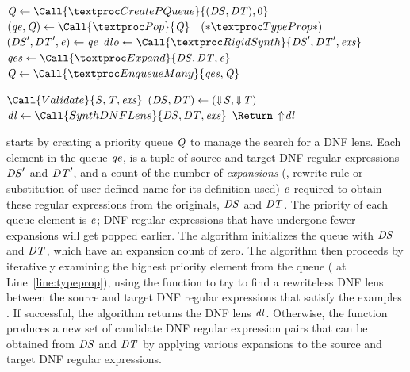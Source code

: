 \documentclass[acmsmall]{acmart}
\begin{document}

\begin{algorithm}
  \caption{\SynthLens}
  \label{alg:synthlens2}
  \begin{algorithmic}[1]
    \State $\Queue \gets \Call{\CreatePQueue}{(\DNFRegex,\DNFRegexAlt),0}$
    \While{$\True$}
    \State $(\QueueElement,\Queue) \gets \Call{\Pop}{\Queue}\quad(* \TypeProp
    *)$ \label{line:typeprop}
    \State $(\mathit{DS}',\mathit{DT}',\mathit{e}) \gets \mathit{qe}$
    \State $\DNFLensOption \gets
    \Call{\RigidSynth}{\DNFRegex',\DNFRegexAlt',\Examples}$
    \Switch{\DNFLensOption}
    \CaseTwo {\SomeOf{\DNFLens}}{\ReturnVal{\DNFLens}}
    \EndCaseTwo
    \Case {\None}
    \State $\QueueElements \gets \Call{\Expand}{\DNFRegex,\DNFRegexAlt,\ExpCount}$
    \State $\Queue \gets \Call{\EnqueueMany}{\QueueElements,\Queue}$
    \EndCase
    \EndSwitch
    \EndWhile
    \EndFunction
    
    \Statex
    \State $\Call{Validate}{\Regex,\RegexAlt,\Examples}$
    \State $(\mathit{DS},\mathit{DT}) \gets
    (\Downarrow\mkern-4mu \mathit{S},\Downarrow\mkern-4mu \mathit{T})$
    \State $\DNFLens \gets \Call{SynthDNFLens}{\DNFRegex,\DNFRegexAlt,\Examples}$
    \State $\ReturnVal{\ToLensOf{\DNFLens}}$
    \EndFunction
  \end{algorithmic}
\end{algorithm}

\SynthDNFLens{} starts by creating a priority queue $\mathit{Q}$ to manage
the search for a DNF lens.  Each element in the queue
$\mathit{qe}$, is a tuple of source and target DNF regular
expressions $\mathit{DS}'$ and $\mathit{DT}'$, and a count of the number
of \emph{expansions} (\IE, rewrite rule or substitution of user-defined
name for its definition used) $\mathit{e}$ required to obtain these regular
expressions from the originals, $\mathit{DS}$ and
$\mathit{DT}$. The priority of each queue element is $\mathit{e}$; DNF regular
expressions that have undergone fewer expansions will get popped earlier.
The algorithm initializes the queue with
$\mathit{DS}$ and $\mathit{DT}$, which have an expansion count of
zero.  The algorithm then proceeds by iteratively examining the
highest priority element from the queue (\TypeProp{} at
Line~\ref{line:typeprop}), using the 
function \RigidSynth{} to try to find a rewriteless DNF lens
between the source and target DNF regular expressions that satisfy
the examples \Examples{}.  If successful, the algorithm returns the
DNF lens $\mathit{dl}$.  Otherwise, the function \Expand{} produces
a new set of candidate DNF regular expression pairs that can
be obtained from $\mathit{DS}$ and $\mathit{DT}$ by
applying various expansions to the source and target DNF regular
expressions.
\end{document}
